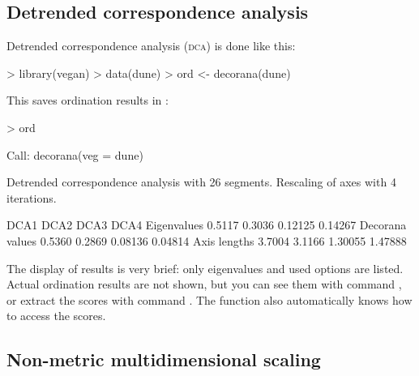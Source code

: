 \documentclass[a4paper,10pt]{article}
\begin{document}
\subsection{Detrended correspondence analysis}


Detrended correspondence analysis (\textsc{dca}) is done like this:
\begin{Schunk}
\begin{Sinput}
> library(vegan)
> data(dune)
> ord <- decorana(dune)
\end{Sinput}
\end{Schunk}
This saves ordination results in :
\begin{Schunk}
\begin{Sinput}
> ord
\end{Sinput}
\begin{Soutput}
Call:
decorana(veg = dune) 

Detrended correspondence analysis with 26 segments.
Rescaling of axes with 4 iterations.

                  DCA1   DCA2    DCA3    DCA4
Eigenvalues     0.5117 0.3036 0.12125 0.14267
Decorana values 0.5360 0.2869 0.08136 0.04814
Axis lengths    3.7004 3.1166 1.30055 1.47888
\end{Soutput}
\end{Schunk}
The display of results is very brief: only eigenvalues and used
options are listed.  Actual ordination results are not shown, but you
can see them with command , or extract the scores
with command .  The  function also
automatically knows how to access the scores.

\subsection{Non-metric multidimensional scaling}
\end{document}
